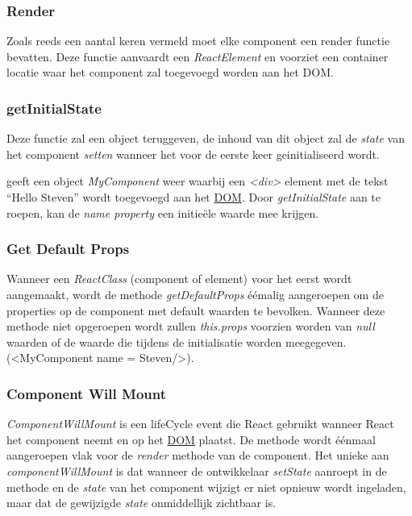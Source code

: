 	\subsubsection{Render}	\label{section:rjsrender}
		
		Zoals reeds een aantal keren vermeld moet elke component een render functie bevatten. Deze functie aanvaardt een \emph{ReactElement} en voorziet een container locatie waar het component zal toegevoegd worden aan het DOM.
	
	\subsubsection{getInitialState}
		
		Deze functie zal een object teruggeven, de inhoud van dit object zal de \emph{state} van het component \emph{setten} wanneer het voor de eerste keer geinitialiseerd wordt.
		
		
		 geeft een object \emph{MyComponent} weer waarbij een \emph{<div>} element met de tekst ``Hello Steven'' wordt toegevoegd aan het \hyperref[dom]{DOM}. Door \emph{getInitialState} aan te roepen, kan de \emph{name property} een initieële waarde mee krijgen.
	
	\subsubsection{Get Default Props}
		
		Wanneer een \emph{ReactClass} (component of element) voor het eerst wordt aangemaakt, wordt de methode \emph{getDefaultProps} éémalig aangeroepen om de properties op de component met default waarden te bevolken. Wanneer deze methode niet opgeroepen wordt zullen \emph{this.props} voorzien worden van \emph{null} waarden of de waarde die tijdens de initialisatie worden meegegeven. (<MyComponent name = \textquotedbl Steven\textquotedbl />).
	
	\subsubsection{Component Will Mount}
		
		\emph{ComponentWillMount} is een lifeCycle event die React gebruikt wanneer React het component neemt en op het \hyperref[dom]{DOM} plaatst. De methode wordt éénmaal aangeroepen vlak voor de \emph{render} methode van de component. Het unieke aan \emph{componentWillMount} is dat wanneer de ontwikkelaar \emph{setState} aanroept in de methode en de \emph{state} van het component wijzigt er niet opnieuw wordt ingeladen, maar dat de gewijzigde \emph{state} onmiddellijk zichtbaar is.
	

